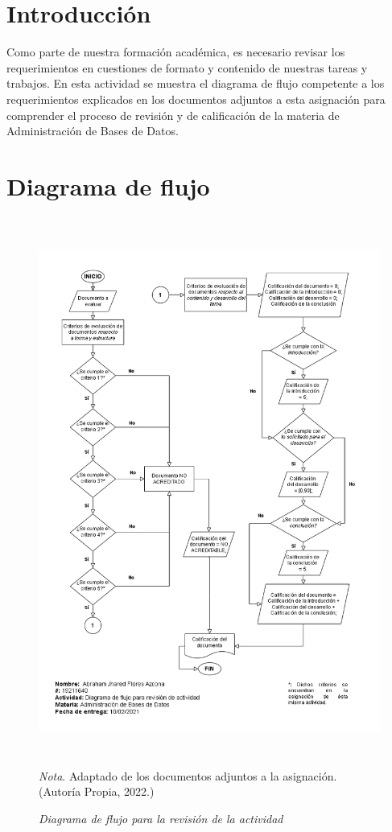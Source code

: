 \documentclass[stu, 12pt, letterpaper, donotrepeattitle, floatsintext, natbib]{apa7}
\begin{document}
\section{Introducción}
    \begin{justifying}
Como parte de nuestra formación académica, es necesario revisar los requerimientos en cuestiones de
formato y contenido de nuestras tareas y trabajos. En esta actividad se muestra el diagrama de flujo competente
a los requerimientos explicados en los documentos adjuntos a esta asignación para comprender el proceso de revisión y
de calificación de la materia de Administración de Bases de Datos.\par
    \end{justifying}

\section{Diagrama de flujo}
\begin{figure}[H]
    \caption{\emph{Diagrama de flujo para la revisión de la actividad\\}}
    \centering
    \smallskip
    \includegraphics[width=17cm, height=18cm]{flux.png}
    \bigskip
    \justifying\small\textit{Nota}. Adaptado de los documentos adjuntos a la asignación. %
    (Autoría Propia, 2022.)
\end{figure}
\end{document}
